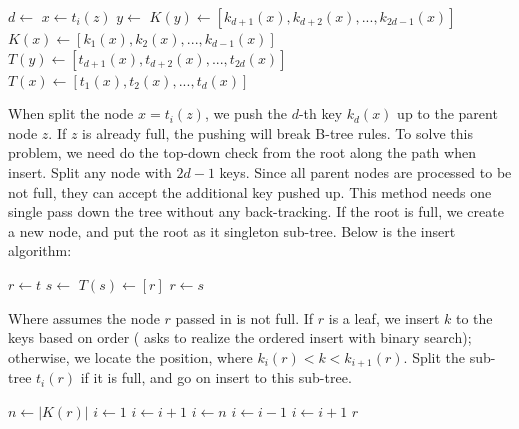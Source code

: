 \documentclass[b5paper]{article}
\begin{document}
\begin{algorithmic}[1]
  \State $d \gets$ 
  \State $x \gets t_i(z)$
  \State $y \gets$ 
  \State $K(y) \gets [k_{d + 1}(x), k_{d + 2}(x), ..., k_{2d - 1}(x)]$
  \State $K(x) \gets [k_1(x), k_2(x), ..., k_{d-1}(x)]$
    \State $T(y) \gets [t_{d + 1}(x), t_{d + 2}(x), ..., t_{2d}(x)]$
    \State $T(x) \gets [t_1(x), t_2(x), ..., t_d(x)]$
  \EndIf
  \State {}
  \State {}
\EndProcedure
\end{algorithmic}

When split the node $x = t_i(z)$, we push the $d$-th key $k_d(x)$ up to the parent node $z$. If $z$ is already full, the pushing will break B-tree rules. To solve this problem, we need do the top-down check from the root along the path when insert. Split any node with $2d - 1$ keys. Since all parent nodes are processed to be not full, they can accept the additional key pushed up. This method needs one single pass down the tree without any back-tracking. If the root is full, we create a new node, and put the root as it singleton sub-tree. Below is the insert algorithm:

\begin{algorithmic}[1]
  \State $r \gets t$
   
    \State $s \gets$ 
    \State $T(s) \gets [ r ]$
    \State {}
    \State $r \gets s$
  \EndIf
  \State \Return {}
\EndFunction
\end{algorithmic}

Where  assumes the node $r$ passed in
is not full. If $r$ is a leaf, we insert $k$ to the keys based on order ( asks to realize the ordered insert with binary search); otherwise, we locate the position, where $k_i(r) < k < k_{i+1}(r)$. Split the sub-tree $t_i(r)$ if it is full, and go on insert to this sub-tree.

\begin{algorithmic}[1]
  \State $n \gets |K(r)|$
    \State $i \gets 1$
      \State $i \gets i + 1$
    \EndWhile
    \State {}
  \Else
    \State $i \gets n$
      \State $i \gets i - 1$
    \EndWhile
      \State {}
        \State $i \gets i + 1$
      \EndIf
    \EndIf
    \State {}
  \EndIf
  \State \Return $r$
\EndFunction
\end{algorithmic}
\end{document}
